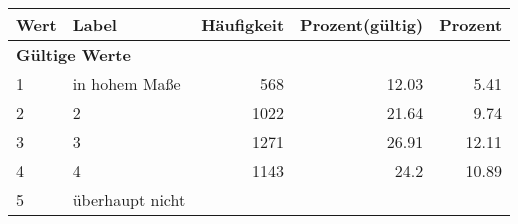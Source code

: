      \begin{longtable}{lXrrr}
     \toprule
     \textbf{Wert} & \textbf{Label} & \textbf{Häufigkeit} & \textbf{Prozent(gültig)} & \textbf{Prozent} \\
     \endhead
     \midrule
     \multicolumn{5}{l}{\textbf{Gültige Werte}}\\

     1 &
     \multicolumn{1}{X}{ in hohem Maße   } &


       \num{568} &
       \num[round-mode=places,round-precision=2]{12,03} &
         \num[round-mode=places,round-precision=2]{5,41} \\

     2 &
     \multicolumn{1}{X}{ 2   } &


       \num{1022} &
       \num[round-mode=places,round-precision=2]{21,64} &
         \num[round-mode=places,round-precision=2]{9,74} \\

     3 &
     \multicolumn{1}{X}{ 3   } &


       \num{1271} &
       \num[round-mode=places,round-precision=2]{26,91} &
         \num[round-mode=places,round-precision=2]{12,11} \\

     4 &
     \multicolumn{1}{X}{ 4   } &


       \num{1143} &
       \num[round-mode=places,round-precision=2]{24,2} &
         \num[round-mode=places,round-precision=2]{10,89} \\

     5 &
     \multicolumn{1}{X}{ überhaupt nicht   } &



\end{longtable}
